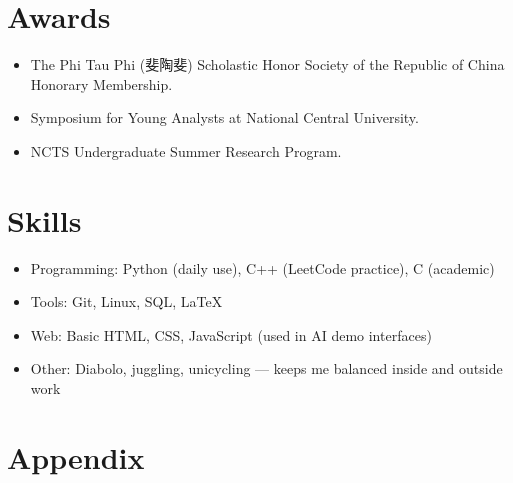 \documentclass[a4paper,10pt]{article}
\newcommand{\coloredsection}[1]{\section*{\textcolor{blue!70!black}{#1}}}
\begin{document}
\coloredsection{Awards}
\begin{itemize}[leftmargin=30pt]
    \item The Phi Tau Phi (斐陶斐) Scholastic Honor Society of the Republic of China Honorary Membership.
    \item Symposium for Young Analysts at National Central University.
    \item NCTS Undergraduate Summer Research Program.
\end{itemize}

\coloredsection{Skills}
\begin{itemize}[leftmargin=30pt]
    \item Programming: Python (daily use), C++ (LeetCode practice), C (academic)
    \item Tools: Git, Linux, SQL, \LaTeX
    \item Web: Basic HTML, CSS, JavaScript (used in AI demo interfaces)
    \item Other: Diabolo, juggling, unicycling — keeps me balanced inside and outside work
\end{itemize}


\coloredsection{Appendix}
\end{document}

